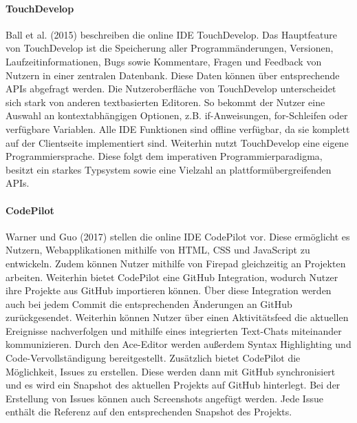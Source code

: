 \paragraph{TouchDevelop}
Ball et al. (2015) \cite{ball_beyond_2015} beschreiben die online IDE TouchDevelop. Das Hauptfeature von TouchDevelop ist die Speicherung aller Programmänderungen, Versionen, Laufzeitinformationen, Bugs sowie Kommentare, Fragen und Feedback von Nutzern in einer zentralen Datenbank. Diese Daten können über entsprechende APIs abgefragt werden. Die Nutzeroberfläche von TouchDevelop unterscheidet sich stark von anderen textbasierten Editoren. So bekommt der Nutzer eine Auswahl an kontextabhängigen Optionen, z.B. if-Anweisungen, for-Schleifen oder verfügbare Variablen. Alle IDE Funktionen sind offline verfügbar, da sie komplett auf der Clientseite implementiert sind. Weiterhin nutzt TouchDevelop eine eigene Programmiersprache. Diese folgt dem imperativen Programmierparadigma, besitzt ein starkes Typsystem sowie eine Vielzahl an plattformübergreifenden APIs.

\paragraph{CodePilot}
Warner und Guo (2017) \cite{warner_codepilot_2017} stellen die online IDE CodePilot vor. Diese ermöglicht es Nutzern, Webapplikationen mithilfe von HTML, CSS und JavaScript zu entwickeln. Zudem können Nutzer mithilfe von Firepad \cite{noauthor_firepad_nodate} gleichzeitig an Projekten arbeiten. Weiterhin bietet CodePilot eine GitHub \cite{noauthor_github_nodate} Integration, wodurch Nutzer ihre Projekte aus GitHub importieren können. Über diese Integration werden auch bei jedem Commit die entsprechenden Änderungen an GitHub zurückgesendet. Weiterhin können Nutzer über einen Aktivitätsfeed die aktuellen Ereignisse nachverfolgen und mithilfe eines integrierten Text-Chats miteinander kommunizieren. Durch den Ace-Editor \cite{noauthor_ace_nodate} werden außerdem Syntax Highlighting und Code-Vervollständigung bereitgestellt. Zusätzlich bietet CodePilot die Möglichkeit, Issues zu erstellen. Diese werden dann mit GitHub synchronisiert und es wird ein Snapshot des aktuellen Projekts auf GitHub hinterlegt. Bei der Erstellung von Issues können auch Screenshots angefügt werden. Jede Issue enthält die Referenz auf den entsprechenden Snapshot des Projekts.

